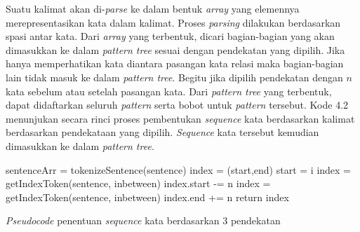Suatu kalimat akan di-\textit{parse} ke dalam bentuk \textit{array} yang elemennya merepresentasikan kata dalam kalimat. Proses \textit{parsing} dilakukan berdasarkan spasi antar kata. Dari \textit{array} yang terbentuk, dicari bagian-bagian yang akan dimasukkan ke dalam \textit{pattern tree} sesuai dengan pendekatan yang dipilih. Jika hanya memperhatikan kata diantara pasangan kata relasi maka bagian-bagian lain tidak masuk ke dalam \textit{pattern tree}. Begitu jika dipilih pendekatan dengan $n$ kata sebelum atau setelah pasangan kata. Dari \textit{pattern tree} yang terbentuk, dapat didaftarkan seluruh \textit{pattern} serta bobot untuk \textit{pattern} tersebut. Kode 4.2 menunjukan secara rinci proses pembentukan \textit{sequence} kata berdasarkan kalimat berdasarkan pendekataan yang dipilih. \textit{Sequence} kata tersebut kemudian dimasukkan ke dalam \textit{pattern tree}. 
%  
%  
%  
%
\begin{kode} 

   {
    
    \BlankLine
    sentenceArr = tokenizeSentence(sentence)\;
    index = (start,end)\;
     {
       {
         {
           {
            start = i\;
          } 
        }
      }
    }  {
      index = getIndexToken(sentence, inbetween)\;
       {
        index.start -= n\;
      } 
    }  {
      index = getIndexToken(sentence, inbetween)\;
       {
        index.end += n\;
      } 
    }
    return index\;
  }
  \label{code:pembentukan-ptree}  
  \caption{\textit{Pseudocode} penentuan \textit{sequence} kata berdasarkan 3 pendekatan}  
\end{kode}

